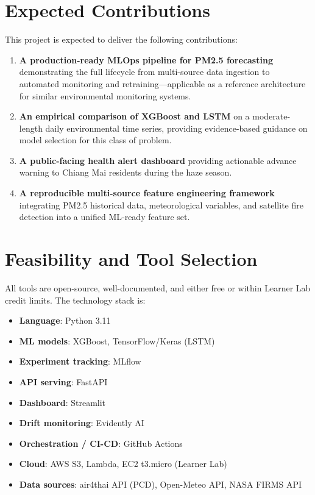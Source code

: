 \documentclass[12pt,a4paper]{report}
\begin{document}
\section{Expected Contributions}

This project is expected to deliver the following contributions:

\begin{enumerate}
  \item \textbf{A production-ready MLOps pipeline for PM2.5 forecasting} demonstrating the full lifecycle from multi-source data ingestion to automated monitoring and retraining---applicable as a reference architecture for similar environmental monitoring systems.
  \item \textbf{An empirical comparison of XGBoost and LSTM} on a moderate-length daily environmental time series, providing evidence-based guidance on model selection for this class of problem.
  \item \textbf{A public-facing health alert dashboard} providing actionable advance warning to Chiang Mai residents during the haze season.
  \item \textbf{A reproducible multi-source feature engineering framework} integrating PM2.5 historical data, meteorological variables, and satellite fire detection into a unified ML-ready feature set.
\end{enumerate}

\section{Feasibility and Tool Selection}

All tools are open-source, well-documented, and either free or within Learner Lab credit limits. The technology stack is:

\begin{itemize}
  \item \textbf{Language}: Python 3.11
  \item \textbf{ML models}: XGBoost, TensorFlow/Keras (LSTM)
  \item \textbf{Experiment tracking}: MLflow
  \item \textbf{API serving}: FastAPI
  \item \textbf{Dashboard}: Streamlit
  \item \textbf{Drift monitoring}: Evidently AI
  \item \textbf{Orchestration / CI-CD}: GitHub Actions
  \item \textbf{Cloud}: AWS S3, Lambda, EC2 t3.micro (Learner Lab)
  \item \textbf{Data sources}: air4thai API (PCD), Open-Meteo API, NASA FIRMS API
\end{itemize}
\end{document}
